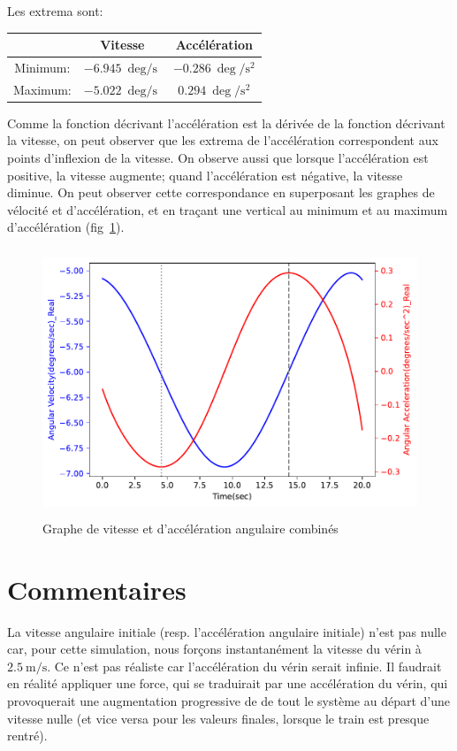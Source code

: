 \documentclass{article}
\begin{document}
Les extrema sont:
\begin{center}
    \begin{tabular}{|c|c|c|}
        \hline
        & Vitesse & Accélération\\
        \hline
        Minimum: & \( \SI{-6,945}{\deg\per\second} \) & \( \SI{-0.286}{\deg\per\second\squared} \)\\
        \hline
        Maximum: & \( \SI{-5.022}{\deg\per\second}\) & \( \SI{0.294}{\deg\per\second\squared} \)\\
        \hline
    \end{tabular}
\end{center}

Comme la fonction décrivant l'accélération est la dérivée de la fonction décrivant la vitesse, on peut observer que les extrema de l'accélération correspondent aux points d'inflexion de la vitesse. On observe aussi que lorsque l'accélération est positive, la vitesse augmente; quand l'accélération est négative, la vitesse diminue. On peut observer cette correspondance en superposant les graphes de vélocité et d'accélération, et en traçant une vertical au minimum et au maximum d'accélération (fig~\ref{fig:combined_vel_accel}).
\begin{figure}[h]
    \centering
    \includegraphics[height=8cm]{data/combined_vel_accel.pdf}
    \caption{Graphe de vitesse et d'accélération angulaire combinés}
    \label{fig:combined_vel_accel}
\end{figure}


\section{Commentaires}
La vitesse angulaire initiale (resp. l'accélération angulaire initiale) n'est pas nulle car, pour cette simulation, nous forçons instantanément la vitesse du vérin à \(\SI{2,5}{\meter\per\second}\). Ce n'est pas réaliste car l'accélération du vérin serait infinie. Il faudrait en réalité appliquer une force, qui se traduirait par une accélération du vérin, qui provoquerait une augmentation progressive de de tout le système au départ d'une vitesse nulle (et vice versa pour les valeurs finales, lorsque le train est presque rentré).
\end{document}
